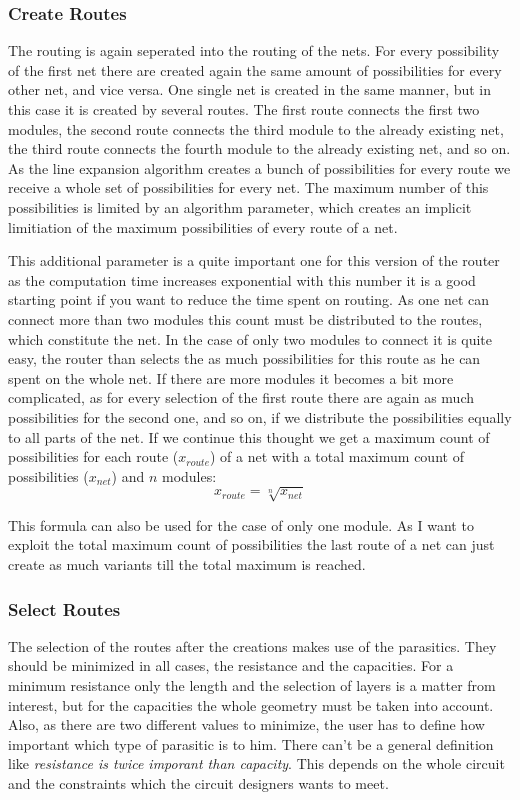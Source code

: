 \subsubsection{Create Routes}
The routing is again seperated into the routing of the nets. For every possibility of the first net there are created again the same amount of possibilities for every other net, and vice versa. One single net is created in the same manner, but in this case it is created by several routes. The first route connects the first two modules, the second route connects the third module to the already existing net, the third route connects the fourth module to the already existing net, and so on. As the line expansion algorithm creates a bunch of possibilities for every route we receive a whole set of possibilities for every net. The maximum number of this possibilities is limited by an algorithm parameter, which creates an implicit limitiation of the maximum possibilities of every route of a net.

This additional parameter is a quite important one for this version of the router as the computation time increases exponential with this number it is a good starting point if you want to reduce the time spent on routing. As one net can connect more than two modules this count must be distributed to the routes, which constitute the net. In the case of only two modules to connect it is quite easy, the router than selects the as much possibilities for this route as he can spent on the whole net. If there are more modules it becomes a bit more complicated, as for every selection of the first route there are again as much possibilities for the second one, and so on, if we distribute the possibilities equally to all parts of the net. If we continue this thought we get a maximum count of possibilities for each route ($x_{route}$) of a net with a total maximum count of possibilities ($x_{net}$) and $n$ modules:
\[x_{route} = \sqrt[n]{x_{net}}\]

This formula can also be used for the case of only one module. As I want to exploit the total maximum count of possibilities the last route of a net can just create as much variants till the total maximum is reached.

\subsubsection{Select Routes}
The selection of the routes after the creations makes use of the parasitics. They should be minimized in all cases, the resistance and the capacities. For a minimum resistance only the length and the selection of layers is a matter from interest, but for the capacities the whole geometry must be taken into account. Also, as there are two different values to minimize, the user has to define how important which type of parasitic is to him. There can't be a general definition like \emph{resistance is twice imporant than capacity}. This depends on the whole circuit and the constraints which the circuit designers wants to meet.

